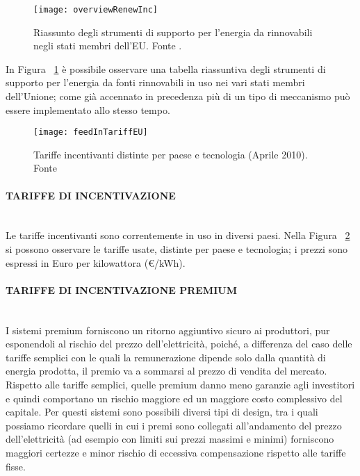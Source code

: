 \documentclass[12pt,a4paper,openright,twoside]{report}
\newcommand{\myparagraph}[1]{\paragraph{#1}\mbox{}\\}
\begin{document}
\begin{figure}[H]
	\centering
	\texttt{[image: overviewRenewInc]}
	\caption{Riassunto degli strumenti di supporto per l'energia da rinnovabili negli stati membri dell'EU. Fonte \cite{energyEU}.}
	\label{overviewRenewInc}
\end{figure}

In Figura ~\ref{overviewRenewInc} è possibile osservare una tabella riassuntiva degli strumenti di supporto per l'energia da fonti rinnovabili in uso nei vari stati membri dell'Unione; come già accennato in precedenza più di un tipo di meccanismo può essere implementato allo stesso tempo.

\begin{figure}[H]
	\centering
	\texttt{[image: feedInTariffEU]}
	\caption{Tariffe incentivanti distinte per paese e tecnologia (Aprile 2010). Fonte \cite{financingRenewEnergy}}
	\label{feedInTariffEU}
\end{figure}

\myparagraph{TARIFFE DI INCENTIVAZIONE}
Le tariffe incentivanti sono correntemente in uso in diversi paesi. Nella Figura ~\ref{feedInTariffEU} si possono osservare le tariffe usate, distinte per paese e tecnologia; i prezzi sono espressi in Euro per kilowattora (\euro/kWh).

\myparagraph{TARIFFE DI INCENTIVAZIONE PREMIUM}
I sistemi premium forniscono un ritorno aggiuntivo sicuro ai produttori, pur esponendoli al rischio del prezzo dell'elettricità, poiché, a differenza del caso delle tariffe semplici con le quali la remunerazione dipende solo dalla quantità di energia prodotta, il premio va a sommarsi al prezzo di vendita del mercato.
Rispetto alle tariffe semplici, quelle premium danno meno garanzie agli investitori e quindi comportano un rischio maggiore ed un maggiore costo complessivo del capitale. Per questi sistemi sono possibili diversi tipi di design, tra i quali possiamo ricordare quelli in cui i premi sono collegati all'andamento del prezzo dell'elettricità (ad esempio con limiti sui prezzi massimi e minimi) forniscono maggiori certezze e minor rischio di eccessiva compensazione rispetto alle tariffe fisse.  
\end{document}
